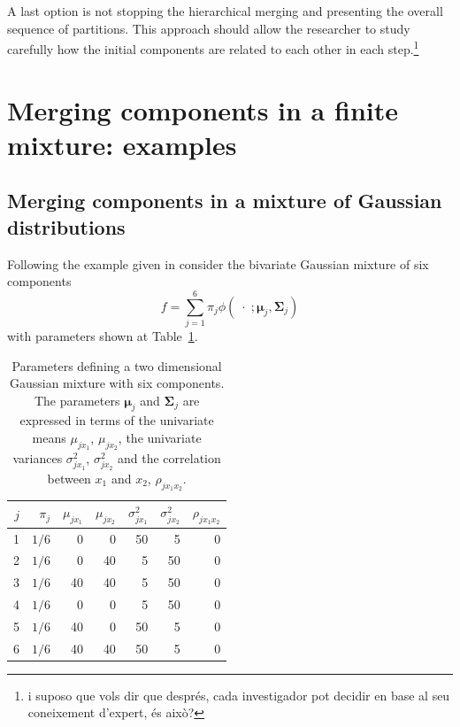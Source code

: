 \documentclass[submit]{smj}
\theoremstyle{definition}
\newcommand{\m}[1]{\boldsymbol{#1}}
\begin{document}
A last option is not stopping the hierarchical merging and presenting the overall sequence of partitions. This approach should allow the researcher to study carefully how the initial components are related to each other in each step.\footnote{i suposo que vols dir que després, cada investigador pot decidir en base al seu coneixement d'expert, és això?}


\section{Merging components in a finite mixture: examples}\label{merging_examples_dist}

\subsection{Merging components in a mixture of Gaussian distributions}

Following the example given in \cite{baudry2010combining} consider the bivariate Gaussian mixture of six components
\[
f= \sum_{j=1}^6 \pi_j \phi(\;\cdot\; ;  \m\mu_j, \m\Sigma_j)
\]
with parameters shown at Table~\ref{pars_table}. 

\begin{table}[t]
\centering
\begin{tabular}{rrrrrrr}
  \hline
$j$ & $\pi_j$ & $\mu_{j x_1}$ & $\mu_{j x_2}$ & $\sigma^2_{j x_1}$ & $\sigma^2_{j x_2}$ & $\rho_{j x_1 x_2}$ \\ 
  \hline
  1 &  $1/6$ &     0 &     0 &    50 &     5 &     0 \\ 
  2 &  $1/6$  &     0 &    40 &     5 &    50 &     0 \\ 
  3 &  $1/6$  &    40 &    40 &     5 &    50 &     0 \\ 
  4 &  $1/6$  &     0 &     0 &     5 &    50 &     0 \\ 
  5 &  $1/6$  &    40 &     0 &    50 &     5 &     0 \\ 
  6 &  $1/6$  &    40 &    40 &    50 &     5 &     0 \\ 
   \hline
\end{tabular}
\caption{Parameters defining a two dimensional Gaussian mixture with six components. The parameters $\m\mu_j$ and $\m\Sigma_j$ are expressed in terms of the univariate means $\mu_{j x_1}$, $\mu_{j x_2}$, the univariate variances $\sigma^2_{j x_1}$, $\sigma^2_{j x_2}$ and the correlation between $x_1$ and $x_2$, $\rho_{j x_1 x_2}$.}
\label{pars_table}
\end{table}
\end{document}
